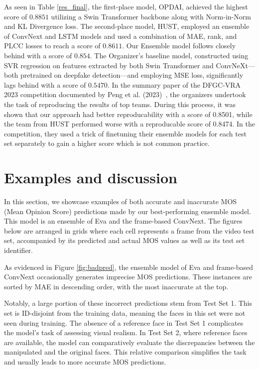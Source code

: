 \documentclass[a4paper,12pt,openright]{book}
\begin{document}
As seen in Table \ref{res_final}, the first-place model, OPDAI, achieved the highest score of \(0.8851\) utilizing a Swin Transformer backbone along with Norm-in-Norm and KL Divergence loss. The second-place model, HUST, employed an ensemble of ConvNext and LSTM models and used a combination of MAE, rank, and PLCC losses to reach a score of \(0.8611\). Our Ensemble model follows closely behind with a score of \(0.854\). The Organizer's baseline model, constructed using SVR regression on features extracted by both Swin Transformer and ConvNeXt—both pretrained on deepfake detection—and employing MSE loss, significantly lags behind with a score of \(0.5470\). In the summary paper of the DFGC-VRA 2023 competition documented by Peng et al. (2023)~\cite{peng_etal_2023}, the organizers undertook the task of reproducing the results of top teams. During this process, it was shown that our approach had better reproducability with a score of 0.8501, while the team from HUST  performed worse with a reproducable score of 0.8474. In the competition, they used a trick of finetuning their ensemble models for each test set separately to gain a higher score which is not common practice.







\newpage

\section{Examples and discussion}
In this section, we showcase examples of both accurate and inaccurate MOS (Mean Opinion Score) predictions made by our best-performing ensemble model. This model is an ensemble of Eva and the frame-based ConvNext. The figures below are arranged in grids where each cell represents a frame from the video test set, accompanied by its predicted and actual MOS values as well as its test set identifier.

As evidenced in Figure \ref{fig:badpred}, the ensemble model of Eva and frame-based ConvNext occasionally generates imprecise MOS predictions. These instances are sorted by MAE in descending order, with the most inaccurate at the top.

Notably, a large portion of these incorrect predictions stem from Test Set 1. This set is ID-disjoint from the training data, meaning the faces in this set were not seen during training. The absence of a reference face in Test Set 1 complicates the model's task of assessing visual realism. In Test Set 2, where reference faces are available, the model can comparatively evaluate the discrepancies between the manipulated and the original faces. This relative comparison simplifies the task and usually leads to more accurate MOS predictions.
\end{document}
